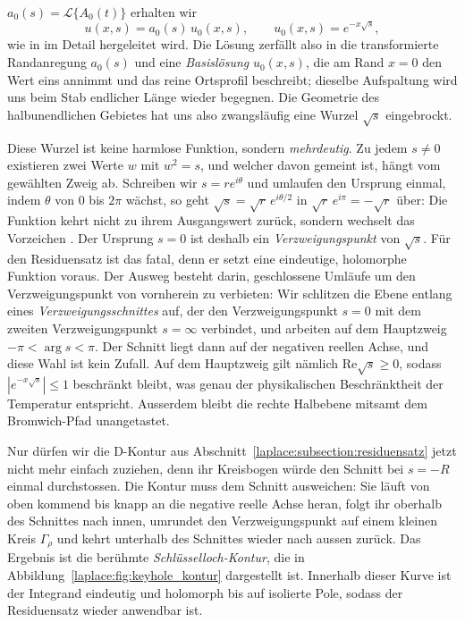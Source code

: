 $a_0(s) = \mathcal{L}\{A_0(t)\}$ erhalten wir
\begin{equation}
    u(x,s)
    =
    a_0(s) \, u_0(x,s),
    \qquad
    u_0(x,s)
    =
    e^{-x\sqrt{s}},
    \label{laplace:eq:halbunendlich_loesung}
\end{equation}
wie in \cite{laplace:doetsch1961} im Detail hergeleitet wird.
Die Lösung zerfällt also in die transformierte Randanregung $a_0(s)$ und
eine \emph{Basislösung} $u_0(x,s)$, die am Rand $x = 0$ den Wert eins
%
annimmt und das reine Ortsprofil beschreibt; dieselbe Aufspaltung wird uns
beim Stab endlicher Länge wieder begegnen.
Die Geometrie des halbunendlichen Gebietes hat uns also zwangsläufig eine
Wurzel $\sqrt{s}$ eingebrockt.

Diese Wurzel ist keine harmlose Funktion, sondern \emph{mehrdeutig}.
%
Zu jedem $s \neq 0$ existieren zwei Werte $w$ mit $w^2 = s$, und welcher
davon gemeint ist, hängt vom gewählten Zweig ab.
Schreiben wir $s = r e^{i\theta}$ und umlaufen den Ursprung einmal, indem
$\theta$ von $0$ bis $2\pi$ wächst, so geht
$\sqrt{s} = \sqrt{r}\, e^{i\theta/2}$ in
$\sqrt{r}\, e^{i\pi} = -\sqrt{r}$ über:
Die Funktion kehrt nicht zu ihrem Ausgangswert zurück, sondern wechselt
das Vorzeichen \cite{laplace:ablowitz2003}.
Der Ursprung $s = 0$ ist deshalb ein \emph{Verzweigungspunkt} von
%
$\sqrt{s}$.
Für den Residuensatz ist das fatal, denn er setzt eine eindeutige,
holomorphe Funktion voraus.
Der Ausweg besteht darin, geschlossene Umläufe um den Verzweigungspunkt von
vornherein zu verbieten:
Wir schlitzen die Ebene entlang eines \emph{Verzweigungsschnittes} auf, der
%
den Verzweigungspunkt $s = 0$ mit dem zweiten Verzweigungspunkt
$s = \infty$ verbindet, und arbeiten auf dem Hauptzweig
$-\pi < \arg s < \pi$.
Der Schnitt liegt dann auf der negativen reellen Achse, und diese Wahl ist
kein Zufall.
Auf dem Hauptzweig gilt nämlich $\text{Re}\sqrt{s} \geq 0$, sodass
$|e^{-x\sqrt{s}}| \leq 1$ beschränkt bleibt, was genau der physikalischen
Beschränktheit der Temperatur entspricht.
Ausserdem bleibt die rechte Halbebene mitsamt dem Bromwich-Pfad
unangetastet.

Nur dürfen wir die D-Kontur aus
Abschnitt~\ref{laplace:subsection:residuensatz} jetzt nicht mehr einfach
zuziehen, denn ihr Kreisbogen würde den Schnitt bei $s = -R$ einmal
durchstossen.
Die Kontur muss dem Schnitt ausweichen:
Sie läuft von oben kommend bis knapp an die negative reelle Achse heran,
folgt ihr oberhalb des Schnittes nach innen, umrundet den
Verzweigungspunkt auf einem kleinen Kreis $\Gamma_\rho$ und kehrt
unterhalb des Schnittes wieder nach aussen zurück.
Das Ergebnis ist die berühmte \emph{Schlüsselloch-Kontur}, die in
%
Abbildung~\ref{laplace:fig:keyhole_kontur} dargestellt ist.
Innerhalb dieser Kurve ist der Integrand eindeutig und holomorph bis auf
isolierte Pole, sodass der Residuensatz wieder anwendbar ist.

